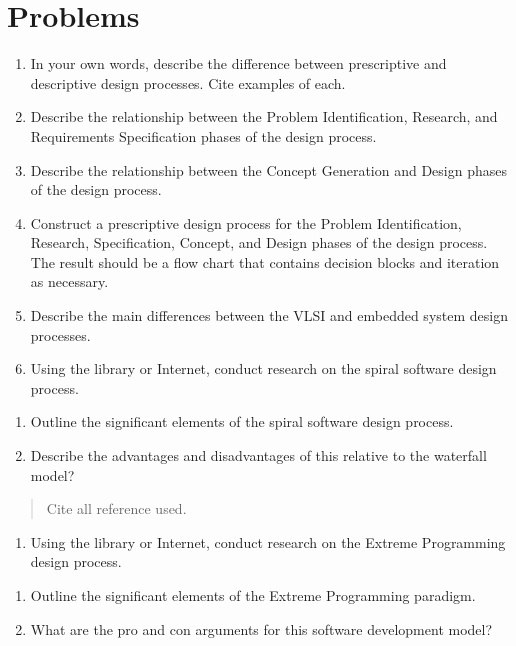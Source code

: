 \section{Problems}\label{problems}

\begin{enumerate}
\def\labelenumi{\arabic{enumi}.}
\item
  In your own words, describe the difference between prescriptive and
  descriptive design processes. Cite examples of each.
\item
  Describe the relationship between the Problem Identification,
  Research, and Requirements Specification phases of the design process.
\item
  Describe the relationship between the Concept Generation and Design
  phases of the design process.
\item
  Construct a prescriptive design process for the Problem
  Identification, Research, Specification, Concept, and Design phases of
  the design process. The result should be a flow chart that contains
  decision blocks and iteration as necessary.
\item
  Describe the main differences between the VLSI and embedded system
  design processes.
\item
  Using the library or Internet, conduct research on the spiral software
  design process.
\end{enumerate}

\begin{enumerate}
\def\labelenumi{\alph{enumi})}
\item
  Outline the significant elements of the spiral software design
  process.
\item
  Describe the advantages and disadvantages of this relative to the
  waterfall model?
\end{enumerate}

\begin{quote}
Cite all reference used.
\end{quote}

\begin{enumerate}
\def\labelenumi{\arabic{enumi}.}
\item
  Using the library or Internet, conduct research on the Extreme
  Programming design process.
\end{enumerate}

\begin{enumerate}
\def\labelenumi{\alph{enumi})}
\item
  Outline the significant elements of the Extreme Programming paradigm.
\item
  What are the pro and con arguments for this software development
  model?
\end{enumerate}

